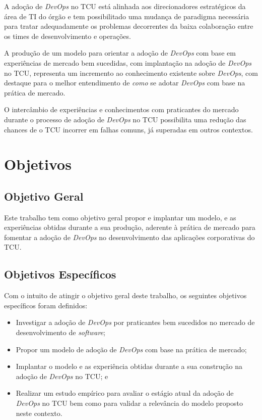 A adoção de \textit{DevOps} no \acrshort{TCU} está alinhada aos direcionadores
estratégicos da área de \acrshort{TI} do órgão e tem possibilitado uma
mudança de paradigma necessária para tratar adequadamente os problemas
decorrentes da baixa colaboração entre os times de desenvolvimento e operações.

A produção de um modelo para orientar a adoção de \textit{DevOps} com base em
experiências de mercado bem sucedidas, com implantação na adoção de
\textit{DevOps} no \acrshort{TCU}, representa um
incremento ao conhecimento existente sobre \textit{DevOps}, com destaque
para o melhor entendimento de \emph{como} se adotar \textit{DevOps} com base na
prática de mercado.

O intercâmbio de experiências e conhecimentos com praticantes do mercado
durante o processo de adoção de \textit{DevOps} no TCU possibilita uma redução
das chances de o \acrshort{TCU} incorrer em falhas comuns, já superadas em
outros contextos.

\section{Objetivos}

\subsection{Objetivo Geral}

Este trabalho tem como objetivo geral propor e implantar um modelo, e as
experiências obtidas durante a sua produção, aderente à prática
de mercado para fomentar a adoção de \textit{DevOps} no desenvolvimento das
aplicações corporativas do \acrshort{TCU}.

\subsection{Objetivos Específicos}
Com o intuito de atingir o objetivo geral deste trabalho, os seguintes objetivos
específicos foram definidos:

\begin{itemize}
\item Investigar a adoção de \textit{DevOps} por praticantes bem sucedidos no
mercado de desenvolvimento de \textit{software};
\item Propor um modelo de adoção de \textit{DevOps} com base na prática de mercado;
\item Implantar o modelo e as experiência obtidas durante a sua construção na
adoção de \textit{DevOps} no \acrshort{TCU}; e
\item Realizar um estudo empírico para avaliar o estágio atual da adoção de
\textit{DevOps} no \acrshort{TCU} bem como para validar a relevância do modelo
proposto neste contexto.
\end{itemize}

